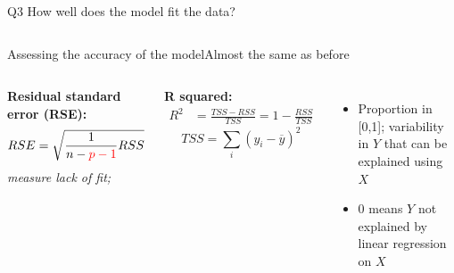 \documentclass[aspectratio=169,usenames,dvipsnames]{beamer}
\newcommand{\InstructorNotes}[1]{\textit{\color{orange}#1}}
\newcommand{\InstructorList}[1]{
\begin{itemize}
	\color{orange}
	#1
\end{itemize}
}
\begin{document}
\begin{frame}

	\begin{columns}
	\centering
	\begin{block}
		{Q3}
	How well does the model fit the data?
	\end{block}
	
	\end{columns}
	
	\end{frame}
	

\begin{frame}[c]{Assessing the accuracy of the model}{Almost the same as before}
	\centering
\begin{columns}
\textbf{Residual standard error (RSE):}
\begin{align*}
	RSE &= \sqrt{ \frac{1}{n-{\color{red}p-1}} RSS}\\
\end{align*}
\InstructorNotes{measure lack of fit; }




\textbf{R squared:}
\begin{align*}
	R^2 &= \frac{TSS-RSS}{TSS} = 1-\frac{RSS}{TSS}
\end{align*}
\begin{equation*}
	TSS = \sum_i (y_i - \overline y)^2
\end{equation*}
\InstructorList{
\item Proportion in [0,1]; variability in $Y$ that can be explained using $X$
\item 0 means $Y$ not explained by linear regression on $X$}
\end{columns}

\end{frame}

\end{document}
